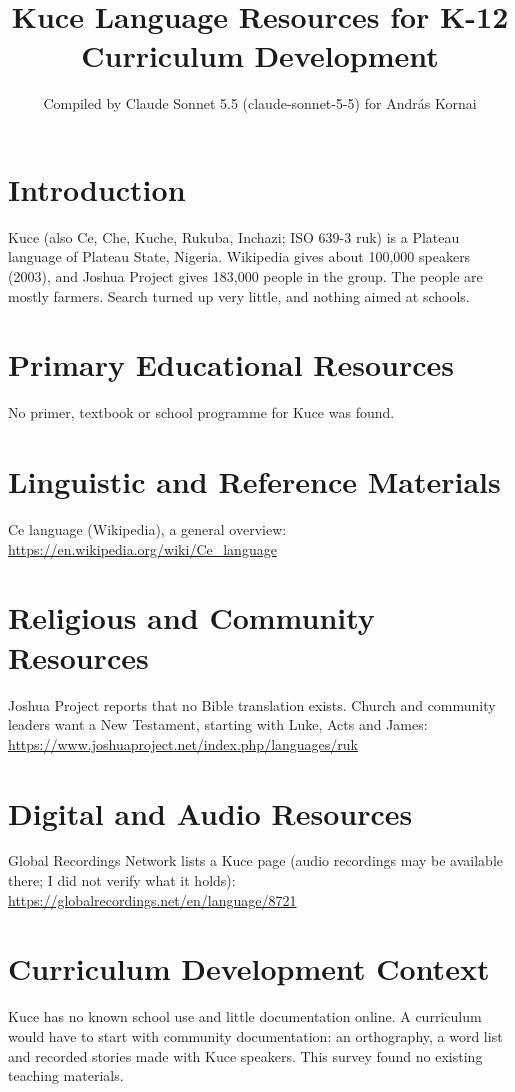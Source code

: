 \documentclass[12pt]{article}
\title{Kuce Language Resources for K-12 Curriculum Development}
\author{Compiled by Claude Sonnet 5.5 (claude-sonnet-5-5) for Andr\'as Kornai}
\date{}
\begin{document}
\maketitle

\section{Introduction}
Kuce (also Ce, Che, Kuche, Rukuba, Inchazi; ISO 639-3 ruk) is a Plateau language of Plateau State, Nigeria. Wikipedia gives about 100,000 speakers (2003), and Joshua Project gives 183,000 people in the group. The people are mostly farmers. Search turned up very little, and nothing aimed at schools.

\section{Primary Educational Resources}
No primer, textbook or school programme for Kuce was found.

\section{Linguistic and Reference Materials}
Ce language (Wikipedia), a general overview: \url{https://en.wikipedia.org/wiki/Ce_language}

\section{Religious and Community Resources}
Joshua Project reports that no Bible translation exists. Church and community leaders want a New Testament, starting with Luke, Acts and James: \url{https://www.joshuaproject.net/index.php/languages/ruk}

\section{Digital and Audio Resources}
Global Recordings Network lists a Kuce page (audio recordings may be available there; I did not verify what it holds): \url{https://globalrecordings.net/en/language/8721}

\section{Curriculum Development Context}
Kuce has no known school use and little documentation online. A curriculum would have to start with community documentation: an orthography, a word list and recorded stories made with Kuce speakers. This survey found no existing teaching materials.
\end{document}
